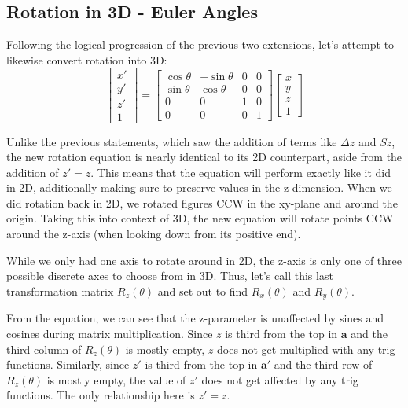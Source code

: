 \documentclass{article}
\begin{document}
\subsection{Rotation in 3D - Euler Angles}
Following the logical progression of the previous two extensions, let's attempt to likewise convert rotation into 3D:
\[
\begin{bmatrix}
x' \\
y' \\
z' \\
1
\end{bmatrix}
=
\begin{bmatrix}
\cos \theta & -\sin \theta & 0 & 0 \\
\sin \theta & \cos \theta & 0 & 0 \\
0 & 0 & 1 & 0 \\
0 & 0 & 0 & 1
\end{bmatrix}
\begin{bmatrix}
x \\
y \\
z \\
1
\end{bmatrix}
\]

Unlike the previous statements, which saw the addition of terms like $\Delta z$ and $Sz$, the new rotation equation is nearly identical to its 2D counterpart, aside from the addition of $z' = z$. This means that the equation will perform exactly like it did in 2D, additionally making sure to preserve values in the z-dimension. When we did rotation back in 2D, we rotated figures CCW in the xy-plane and around the origin. Taking this into context of 3D, the new equation will rotate points CCW around the z-axis (when looking down from its positive end).

While we only had one axis to rotate around in 2D, the z-axis is only one of three possible discrete axes to choose from in 3D. Thus, let's call this last transformation matrix $R_z(\theta)$ and set out to find $R_x(\theta)$ and $R_y(\theta)$.

From the equation, we can see that the z-parameter is unaffected by sines and cosines during matrix multiplication. Since $z$ is third from the top in $\mathbf a$ and the third column of $R_z(\theta)$ is mostly empty, $z$ does not get multiplied with any trig functions. Similarly, since $z'$ is third from the top in $\mathbf a'$ and the third row of $R_z(\theta)$ is mostly empty, the value of $z'$ does not get affected by any trig functions. The only relationship here is $z' = z$.
\end{document}
